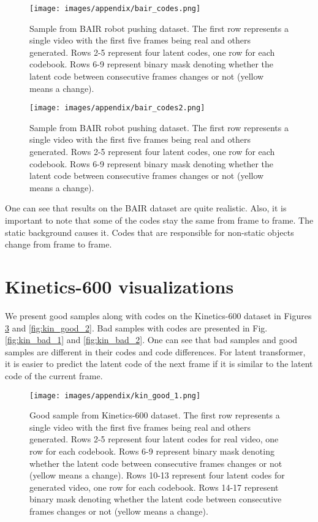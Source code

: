 \documentclass{article}
\begin{document}
\begin{figure}[!h]
\centering
\texttt{[image: images/appendix/bair\_codes.png]}
\caption{Sample from BAIR robot pushing dataset. The first row represents a single video with the first five frames being real and others generated. Rows 2-5 represent four latent codes, one row for each codebook. Rows 6-9 represent binary mask denoting whether the latent code between consecutive frames changes or not (yellow means a change).}
\label{fig:bair_codes}
\end{figure}

\begin{figure}[!h]
\centering
\texttt{[image: images/appendix/bair\_codes2.png]}
\caption{Sample from BAIR robot pushing dataset. The first row represents a single video with the first five frames being real and others generated. Rows 2-5 represent four latent codes, one row for each codebook. Rows 6-9 represent binary mask denoting whether the latent code between consecutive frames changes or not (yellow means a change).} 
\label{fig:bair_codes2}
\end{figure}

One can see that results on the BAIR dataset are quite realistic. Also, it is important to note that some of the codes stay the same from frame to frame. The static background causes it. Codes that are responsible for non-static objects change from frame to frame.


\section{Kinetics-600 visualizations}

We present good samples along with codes on the Kinetics-600 dataset in Figures \ref{fig:kin_good_1} and \ref{fig:kin_good_2}. Bad samples with codes are presented in Fig. \ref{fig:kin_bad_1} and \ref{fig:kin_bad_2}. One can see that bad samples and good samples are different in their codes and code differences. For latent transformer, it is easier to predict the latent code of the next frame if it is similar to the latent code of the current frame.

\begin{figure}[!h]
\centering
\texttt{[image: images/appendix/kin\_good\_1.png]}
\caption{Good sample from Kinetics-600 dataset. The first row represents a single video with the first five frames being real and others generated. Rows 2-5 represent four latent codes for real video, one row for each codebook. Rows 6-9 represent binary mask denoting whether the latent code between consecutive frames changes or not (yellow means a change). Rows 10-13 represent four latent codes for generated video, one row for each codebook. Rows 14-17 represent binary mask denoting whether the latent code between consecutive frames changes or not (yellow means a change).}
\label{fig:kin_good_1}
\end{figure}
\end{document}
